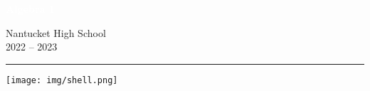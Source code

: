 \documentclass{tstextbook}
\begin{document}
\begin{titlepage}
\BgThispage
{}
\vspace*{0.4\textheight}
\noindent
\textcolor{white}{\Huge\textbf{\textsf{Algebra 1}}}
\vspace*{2cm}\par
\noindent
\begin{minipage}{0.35\linewidth}
    \begin{flushright}
    Nantucket High School \\
    2022 -- 2023
    \end{flushright}
\end{minipage} \hspace{15pt}
%
\begin{minipage}{0.02\linewidth}
    \rule{1pt}{175pt}
\end{minipage} \hspace{-10pt}
%
\begin{minipage}{0.63\linewidth}
\vspace{5pt}
%  
\hspace{35mm}
\texttt{[image: img/shell.png]}
\end{minipage}
\end{titlepage}

\newpage



\setcounter{section}{-1}



\newpage 
\tableofcontents
\newpage
{}











\appendix
\appendixpage

%





\printbibliography{}


\printindex
\end{document}
